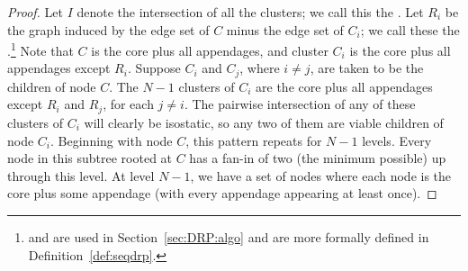 \begin{proof}
    Let $I$ denote the intersection of all the clusters; we call this the . Let $R_i$ be the graph induced by the edge set of $C$ minus the edge set of $C_i$; we call these the .\footnote{ and  are used in Section~\ref{sec:DRP:algo} and are more formally defined in Definition~\ref{def:seqdrp}.} Note that $C$ is the core plus all appendages, and cluster $C_i$ is the core plus all appendages except $R_i$.
    Suppose $C_i$ and $C_j$, where $i\neq j$, are taken to be the children of node $C$.
    The $N-1$ clusters of $C_i$ are the core plus all appendages except $R_i$ and $R_j$, for each $j\neq i$. The pairwise intersection of any of these clusters of $C_i$ will clearly be isostatic, so any two of them are viable children of node $C_i$.
    Beginning with node $C$, this pattern repeats for $N-1$ levels. Every node in this subtree rooted at $C$ has a fan-in of two (the minimum possible) up through this level. At level $N-1$, we have a set of nodes where each node is the core plus some appendage (with every appendage appearing at least once).

\end{proof}
